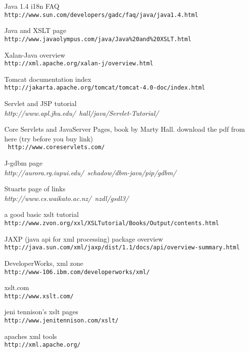 \documentclass[a4paper,11pt]{article}
\begin{document}
Java 1.4 i18n FAQ\\
{\tt http://www.sun.com/developers/gadc/faq/java/java1.4.html}

Java and XSLT page\\
{\tt http://www.javaolympus.com/java/Java\%20and\%20XSLT.html}

Xalan-Java overview\\
{\tt http://xml.apache.org/xalan-j/overview.html}

Tomcat documentation index\\
{\tt http://jakarta.apache.org/tomcat/tomcat-4.0-doc/index.html}

Servlet and JSP tutorial\\
{\em http://www.apl.jhu.edu/~hall/java/Servlet-Tutorial/\/}

Core Servlets and JavaServer Pages, book by Marty Hall. download the
pdf from here (try before you buy link)\\ {\tt
http://www.coreservlets.com/}

J-gdbm page\\
{\em http://aurora.rg.iupui.edu/~schadow/dbm-java/pip/gdbm/\/}

Stuarts page of links\\
{\em http://www.cs.waikato.ac.nz/~nzdl/gsdl3/\/}

a good basic xslt tutorial\\
{\tt http://www.zvon.org/xxl/XSLTutorial/Books/Output/contents.html}

JAXP (java api for xml processing) package overview\\
{\tt http://java.sun.com/xml/jaxp/dist/1.1/docs/api/overview-summary.html}

DeveloperWorks, xml zone\\
{\tt http://www-106.ibm.com/developerworks/xml/}

xslt.com\\
{\tt http://www.xslt.com/}

jeni tennison's xslt pages\\
{\tt http://www.jenitennison.com/xslt/}

apaches xml tools\\
{\tt http://xml.apache.org/}
\end{document}
